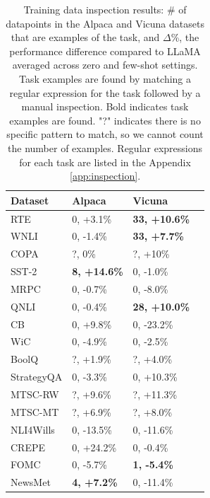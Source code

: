 \documentclass[letterpaper]{article} %
\begin{document}
\begin{table}[t!]
\centering \small
\begin{tabular}{l||lll}
Dataset &  Alpaca & Vicuna  \\ \hline \hline
RTE  &    0, +3.1\%   &\textbf{33, +10.6\%} \\
WNLI &   0, -1.4\%   &\textbf{33, +7.7\%} \\
COPA &   ?, 0\%    & ?, +10\%\\
SST-2 &  \textbf{8, +14.6\%}  & 0, -1.0\% \\
MRPC &  0, -0.7\%  & 0, -8.0\% \\
QNLI &   0, -0.4\%   &\textbf{28, +10.0\%} \\
CB   &   0, +9.8\%   &0, -23.2\%\\
WiC &    0, -4.9\%   & 0, -2.5\% \\
BoolQ &  ?, +1.9\%    & ?, +4.0\%\\
\hline \hline
StrategyQA   & 0, -3.3\%   & 0, +10.3\% \\
MTSC-RW  &  ?,  +9.6\%& ?, +11.3\% \\
MTSC-MT  &  ?, +6.9\%& ?, +8.0\% \\
NLI4Wills    & 0, -13.5\%    & 0, -11.6\%  \\
CREPE  & 0, +24.2\%  & 0, -0.4\%\\
FOMC  & 0, -5.7\%   & \textbf{1, -5.4\%}\\
NewsMet  & \textbf{4, +7.2\%}   & 0, -11.4\%\\
\end{tabular}
\caption[]{Training data inspection results: \# of datapoints in the Alpaca and Vicuna datasets that are examples of the task, and $\Delta$\%, the performance difference compared to LLaMA averaged across zero and few-shot settings. Task examples are found by matching a regular expression for the task followed by a manual inspection. Bold indicates task examples are found.  "?" indicates there is no specific pattern to match, so we cannot count the number of examples.  Regular expressions for each task are listed in the Appendix \ref{app:inspection}.} %
\label{tab:open-source-llm-contam}
\end{table}
\end{document}
